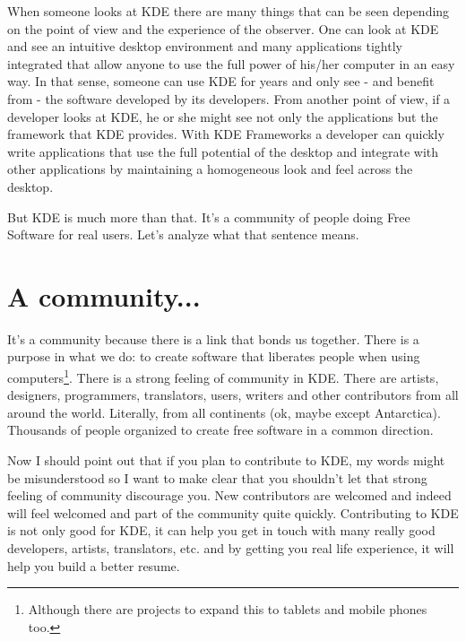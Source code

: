 
\noindent{}When someone looks at KDE there are many things that can be seen depending on the point of view and the experience of the observer. One can look at KDE and see an intuitive desktop environment and many applications tightly integrated that allow anyone to use the full power of his/her computer in an easy way. In that sense, someone can use KDE for years and only see - and benefit from - the software developed by its developers. From another point of view, if a developer looks at KDE, he or she might see not only the applications but the framework that KDE provides. With KDE Frameworks a developer can quickly write applications that use the full potential of the desktop and integrate with other applications by maintaining a homogeneous look and feel across the desktop. 

But KDE is much more than that. It's a community of people doing Free Software for real users. Let's analyze what that sentence means.

\section*{A community...}
It's a community because there is a link that bonds us together. There is a purpose in what we do: to create software that liberates people when using computers\footnote{Although there are projects to expand this to tablets and mobile phones too.}. There is a strong feeling of community in KDE. There are artists, designers, programmers, translators, users, writers and other contributors from all around the world. Literally, from all continents (ok, maybe except Antarctica). Thousands of people organized to create free software in a common direction.

Now I should point out that if you plan to contribute to KDE, my words might be misunderstood so I want to make clear that you shouldn't let that strong feeling of community discourage you. New contributors are welcomed and indeed will feel welcomed and part of the community quite quickly. Contributing to KDE is not only good for KDE, it can help you get in touch with many really good developers, artists, translators, etc. and by getting you real life experience, it will help you build a better resume.

